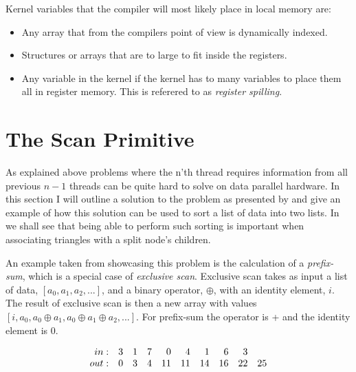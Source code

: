 Kernel variables that the compiler will most likely place in local
memory are:

\begin{itemize}
  \item Any array that from the compilers point of view is dynamically
    indexed.
  \item Structures or arrays that are to large to fit inside the
    registers.
  \item Any variable in the kernel if the kernel has to many variables
    to place them all in register memory. This is referered to as
    \textit{register spilling}.
\end{itemize}



\section{The Scan Primitive}\label{sec:GPUprims}


As explained above problems where the n’th thread requires information from all
previous $n-1$ threads can be quite hard to solve on data parallel hardware. In
this section I will outline a solution to the problem as presented by
\sengupta{} and give an example of how this solution can be used to sort a list
of data into two lists. In  we shall see that being
able to perform such sorting is important when associating triangles with a
split node's children.



An example taken from \sengupta{} showcasing this problem is the calculation of
a \textit{prefix-sum}, which is a special case of \textit{exclusive
  scan}. Exclusive scan takes as input a list of data, $[a_0, a_1, a_2, ...]$,
and a binary operator, $\oplus$, with an identity element, $i$. The result of
exclusive scan is then a new array with values $[i, a_0, a_0 \oplus a_1, a_0
  \oplus a_1 \oplus a_2, ...]$. For prefix-sum the operator is + and the
identity element is 0.

\begin{displaymath}
  \begin{array}{r r r r r r r r r r}
    in: & 3 & 1 & 7 & 0 & 4 & 1 & 6 & 3 \\
    out: & 0 & 3 & 4 & 11 & 11 & 14 & 16 & 22 & 25 \\
  \end{array}
\end{displaymath}

